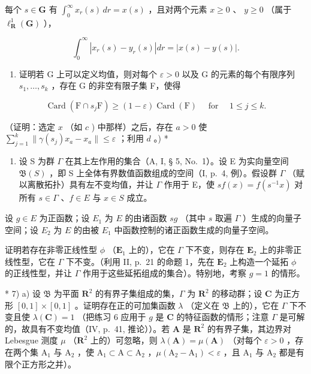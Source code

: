 每个 \(s \in \mathbf{G}\) 有 \(\int_{0}^{\infty} x_r(s) \, dr = x(s)\) ，且对两个元素 \(x \geqslant 0\) 、 \(y \geqslant 0\) （属于 \(\ell_{\mathbf{R}}^{1}(\mathbf{G})\) ），

\[
\int_ {0} ^ {\infty} \left| x _ {r} (s) - y _ {r} (s) \right| d r = \left| x (s) - y (s) \right|.
\]

\begin{enumerate}
\def\labelenumi{\alph{enumi})}
\setcounter{enumi}{4}
\tightlist
\item
  证明若 G 上可以定义均值，则对每个 \(\varepsilon > 0\) 以及 G 的元素的每个有限序列 \(s_1, \ldots, s_k\) ，存在 G 的非空有限子集 F，使得
\end{enumerate}

\[
\operatorname{Card} (\mathrm{F} \cap s _ {j} \mathrm{F}) \geqslant (1 - \varepsilon) \operatorname{Card} (\mathrm{F}) \quad \text { for } \quad 1 \leqslant j \leqslant k.
\]

（证明：选定 \(x\) （如 \(c\) ) 中那样）之后，存在 \(a > 0\) 使 \(\sum_{j=1}^{k} \| \gamma(s_j) x_a - x_a \| \leqslant \varepsilon\) ；利用 \(d\) 。) *

\begin{enumerate}
\def\labelenumi{\arabic{enumi})}
\setcounter{enumi}{5}
\tightlist
\item
  设 S 为群 \(\Gamma\) 在其上左作用的集合（A, I, § 5, No.~1）。设 E 为实向量空间 \(\mathfrak{B}(S)\) ，即 S 上全体有界数值函数组成的空间（I, p.~4, 例）。假设群 \(\Gamma\) （赋以离散拓扑）具有左不变均值，并让 \(\Gamma\) 作用于 E，使 \(sf(x) = f(s^{-1}x)\) 对所有 \(s \in \Gamma\) 、\(f \in E\) 与 \(x \in S\) 成立。
\end{enumerate}

设 \(g \in E\) 为正函数；设 \(E_1\) 为 \(E\) 的由诸函数 \(sg\) （其中 \(s\) 取遍 \(\Gamma\) ）生成的向量子空间；设 \(E_2\) 为 \(E\) 的由被 \(E_1\) 中函数控制的诸正函数生成的向量子空间。

证明若存在非零正线性型 \(\phi\) （\(\mathbf{E}_1\) 上的），它在 \(\Gamma\) 下不变，则存在 \(\mathbf{E}_2\) 上的非零正线性型，它在 \(\Gamma\) 下不变。（利用 II, p.~21 的命题 1，先在 \(\mathbf{E}_2\) 上构造一个延拓 \(\phi\) 的正线性型，并让 \(\Gamma\) 作用于这些延拓组成的集合）。特别地，考察 \(g = 1\) 的情形。

* 7) a) 设 \(\mathfrak{B}\) 为平面 \(\mathbf{R}^2\) 的有界子集组成的集，\(\Gamma\) 为 \(\mathbf{R}^2\) 的移动群；设 \(\mathbf{C}\) 为正方形 \([0,1]\times [0,1]\) 。证明存在正的可加集函数 \(\lambda\) （定义在 \(\mathfrak{B}\) 上的），它在 \(\Gamma\) 下不变且使 \(\lambda (\mathbf{C}) = 1\) （把练习 6 应用于 \(g\) 是 \(\mathbf{C}\) 的特征函数的情形；注意 \(\Gamma\) 是可解的，故具有不变均值（IV, p.~41, 推论））。若 \(\mathbf{A}\) 是 \(\mathbf{R}^2\) 的有界子集，其边界对 Lebesgue 测度 \(\mu\) （\(\mathbf{R}^2\) 上的）可忽略，则 \(\lambda (\mathbf{A}) = \mu (\mathbf{A})\) （对每个 \(\varepsilon >0\) ，存在两个集 \(\mathrm{A}_1\) 与 \(\mathrm{A}_2\) ，使 \(\mathrm{A}_1\subset \mathrm{A}\subset \mathrm{A}_2\) ，\(\mu (\mathrm{A}_2 - \mathrm{A}_1) < \varepsilon\) ，且 \(\mathrm{A}_1\) 与 \(\mathrm{A}_2\) 都是有限个正方形之并）。

